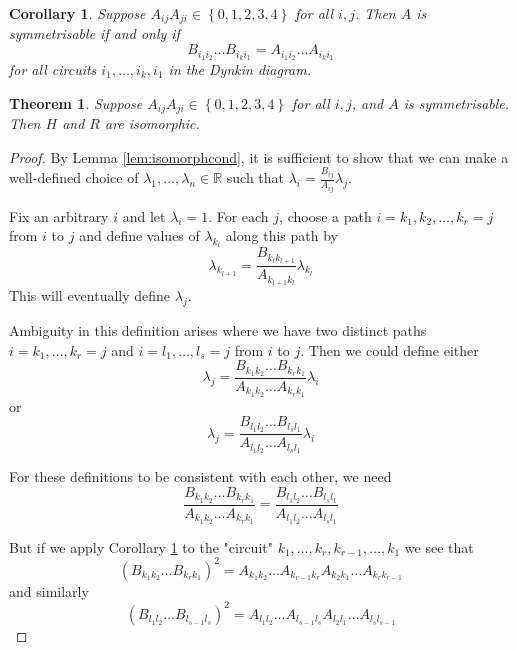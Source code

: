 \documentclass[10pt,a4paper]{amsart}
\newtheorem{corollary}{Corollary}
\newtheorem{theorem}{Theorem}
\begin{document}
\begin{corollary} \label{cor:symmreflectcond} Suppose $A_{ij} A_{ji} \in \left\{0,1,2,3,4\right\}$ for all $i, j$. Then $A$ is symmetrisable if and only if \begin{equation*}
    B_{i_1i_2} \ldots B_{i_k i_1} = A_{i_1i_2} \ldots A_{i_k i_1}
\end{equation*} for all circuits $i_1, \ldots, i_k, i_1$ in the Dynkin diagram. \end{corollary}

\begin{theorem} \label{thm:reflectisomorph} Suppose $A_{ij} A_{ji} \in \left\{0,1,2,3,4\right\}$ for all $i, j$, and $A$ is symmetrisable. Then $H$ and $R$ are isomorphic.\end{theorem}

\begin{proof} By Lemma \ref{lem:isomorphcond}, it is sufficient to show that we can make a well-defined choice of $\lambda_1, \ldots, \lambda_n \in \mathbb{R}$ such that $\lambda_i = \frac{B_{ij}}{A_{ij}} \lambda_j$. 

Fix an arbitrary $i$ and let $\lambda_i = 1$. For each $j$, choose a path $i = k_1, k_2, \ldots, k_r = j$  from $i$ to $j$ and define values of $\lambda_{k_l}$ along this path by \begin{equation*}\lambda_{k_{l+1}} = \dfrac{B_{k_l k_{l+1}}}{A_{k_{l+1} k_l}} \lambda_{k_l}\end{equation*} This will eventually define $\lambda_j$.

Ambiguity in this definition arises where we have two distinct paths $i = k_1, \ldots, k_r = j$ and $i = l_1, \ldots, l_s = j$ from $i$ to $j$. Then we could define either \begin{equation*} \lambda_j = \dfrac{ B_{k_1k_2} \ldots B_{k_r k_1}}{A_{k_1k_2} \ldots A_{k_r k_1}} \lambda_i\end{equation*} or \begin{equation*} \lambda_j = \dfrac{B_{l_1l_2} \ldots B_{l_s l_1}}{A_{l_1l_2} \ldots A_{l_s l_1}} \lambda_i\end{equation*}

For these definitions to be consistent with each other, we need  \begin{equation*}\dfrac{B_{k_1k_2} \ldots B_{k_r k_1}}{A_{k_1k_2} \ldots A_{k_r k_1}}= \frac{B_{l_1l_2} \ldots B_{l_s l_1}}{A_{l_1l_2} \ldots A_{l_s l_1}}\end{equation*}

But if we apply Corollary \ref{cor:symmreflectcond} to the "circuit" $k_1, \ldots, k_r, k_{r-1}, \ldots, k_1$ we see that \begin{equation*}(B_{k_1k_2} \ldots B_{k_r k_1})^2 = A_{k_1k_2} \ldots A_{k_{r-1} k_r} A_{k_2k_1} \ldots A_{k_r k_{r-1}}\end{equation*} and similarly \begin{equation*}(B_{l_1l_2} \ldots B_{l_{s-1} l_s})^2 = A_{l_1l_2} \ldots A_{l_{s-1} l_s} A_{l_2l_1} \ldots A_{l_s l_{s-1}}\end{equation*}


\end{proof}
\end{document}
